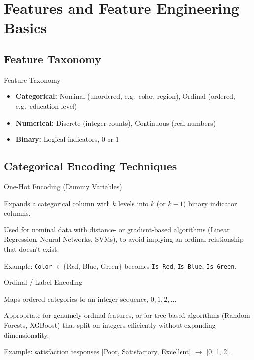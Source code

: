 \section{Features and Feature Engineering Basics}

\subsection{Feature Taxonomy}


\begin{frame}{Feature Taxonomy}
    \begin{itemize}
        \item \textbf{Categorical:} Nominal (unordered, e.g.\ color, region), Ordinal (ordered, e.g.\ education level)
        \item \textbf{Numerical:} Discrete (integer counts), Continuous (real numbers)
        \item \textbf{Binary:} Logical indicators, $0$ or $1$
    \end{itemize}
\end{frame}


\subsection{Categorical Encoding Techniques}


\begin{frame}{One-Hot Encoding (Dummy Variables)}
    \begin{sitemize}
        \item Expands a categorical column with $k$ levels into $k$ (or $k-1$) binary indicator columns.
        \item Used for nominal data with distance- or gradient-based algorithms (Linear Regression, Neural Networks, SVMs), to avoid implying an ordinal relationship that doesn't exist.
        \item Example: \texttt{Color} $\in \{$Red, Blue, Green$\}$ becomes \texttt{Is\_Red}, \texttt{Is\_Blue}, \texttt{Is\_Green}.
    \end{sitemize}
\end{frame}


\begin{frame}{Ordinal / Label Encoding}
    \begin{sitemize}
        \item Maps ordered categories to an integer sequence, $0, 1, 2, \dots$
        \item Appropriate for genuinely ordinal features, or for tree-based algorithms (Random Forests, XGBoost) that split on integers efficiently without expanding dimensionality.
        \item Example: satisfaction responses [Poor, Satisfactory, Excellent] $\to$ [0, 1, 2].
    \end{sitemize}
\end{frame}


